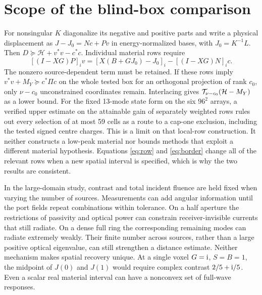 \section{Scope of the blind-box comparison}\label{app:limits}
For nonsingular $K$ diagonalize its negative and positive parts and write a physical displacement as $J-J_0=Nc+Pv$ in energy-normalized bases, with $J_0=K^{-1}L$. Then $D\succeq\mathcal H+v^*v-c^*c$. Individual material rows require
\[
 [(I-XG)P]_i v=[X(B+GJ_0)-J_0]_i-[(I-XG)N]_i c .
\]
The nonzero source-dependent term must be retained. If these rows imply $v^*v+M_Y\succeq c^*\Pi c$ on the whole tested box for an orthogonal projection of rank $c_0$, only $\nu-c_0$ unconstrained coordinates remain. Interlacing gives $\mathcal T_{\nu-c_0}(\mathcal H-M_Y)$ as a lower bound. For the fixed 13-mode state form on the six $96^2$ arrays, a verified upper estimate on the attainable gain of separately weighted rows rules out every selection of at most 59 cells as a route to a cap-one exclusion, including the tested signed centre charges. This is a limit on that local-row construction. It neither constructs a low-peak material nor bounds methods that exploit a different material hypothesis. Equations \eqref{eq:row} and \eqref{eq:border} change all of the relevant rows when a new spatial interval is specified, which is why the two results are consistent.

In the large-domain study, contrast and total incident fluence are held fixed when varying the number of sources. Measurements can add angular information until the port fields repeat combinations within tolerance. On a half aperture the restrictions of passivity and optical power can constrain receiver-invisible currents that still radiate. On a dense full ring the corresponding remaining modes can radiate extremely weakly. Their finite number across sources, rather than a large positive optical eigenvalue, can still strengthen a distance estimate. Neither mechanism makes spatial recovery unique. At a single voxel $G={\rm i}$, $S=B=1$, the midpoint of $J(0)$ and $J(1)$ would require complex contrast $2/5+{\rm i}/5$. Even a scalar real material interval can have a nonconvex set of full-wave responses.
